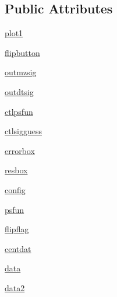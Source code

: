 \subsection*{Public Attributes}
\begin{DoxyCompactItemize}
\item 
\hyperlink{class_uni_dec_1_1unidec__modules_1_1peakwidthtools_1_1_peak_tools2d_a5165f79ff3ed30fb5359d55b09866f79}{plot1}
\item 
\hyperlink{class_uni_dec_1_1unidec__modules_1_1peakwidthtools_1_1_peak_tools2d_afe732cc39a9b166db058123629f25b24}{flipbutton}
\item 
\hyperlink{class_uni_dec_1_1unidec__modules_1_1peakwidthtools_1_1_peak_tools2d_ad51a00aee37e527e38395216fce584be}{outmzsig}
\item 
\hyperlink{class_uni_dec_1_1unidec__modules_1_1peakwidthtools_1_1_peak_tools2d_a2ff83d26a27181aa3c069b573af12c57}{outdtsig}
\item 
\hyperlink{class_uni_dec_1_1unidec__modules_1_1peakwidthtools_1_1_peak_tools2d_a26f6a20c9a7f04adc707dd1c5d537d9e}{ctlpsfun}
\item 
\hyperlink{class_uni_dec_1_1unidec__modules_1_1peakwidthtools_1_1_peak_tools2d_ab65cb49811af76e8fde5e3467cbcfa4f}{ctlsigguess}
\item 
\hyperlink{class_uni_dec_1_1unidec__modules_1_1peakwidthtools_1_1_peak_tools2d_aa1a02d194f7bc6fa616d32ff96e5426e}{errorbox}
\item 
\hyperlink{class_uni_dec_1_1unidec__modules_1_1peakwidthtools_1_1_peak_tools2d_a236ed9a7b69887e85e016053af0f0e6f}{resbox}
\item 
\hyperlink{class_uni_dec_1_1unidec__modules_1_1peakwidthtools_1_1_peak_tools2d_a8a1b2cc690f0c7040621f13f262afb45}{config}
\item 
\hyperlink{class_uni_dec_1_1unidec__modules_1_1peakwidthtools_1_1_peak_tools2d_a5cd7f3c11c2444a799f0823918eb6aed}{psfun}
\item 
\hyperlink{class_uni_dec_1_1unidec__modules_1_1peakwidthtools_1_1_peak_tools2d_acff0c86f4cfa66203c4ac755b486a7f7}{flipflag}
\item 
\hyperlink{class_uni_dec_1_1unidec__modules_1_1peakwidthtools_1_1_peak_tools2d_afec7ce930fced155fe933585e6e8179e}{centdat}
\item 
\hyperlink{class_uni_dec_1_1unidec__modules_1_1peakwidthtools_1_1_peak_tools2d_ad6b057207f96840b3e447b99ce00ccd0}{data}
\item 
\hyperlink{class_uni_dec_1_1unidec__modules_1_1peakwidthtools_1_1_peak_tools2d_a5bbcc81e33cea4a1272cdc0dfa633087}{data2}

\end{DoxyCompactItemize}
